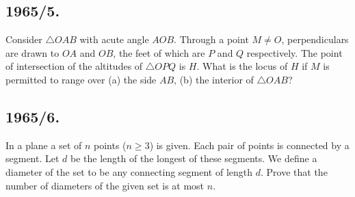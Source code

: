 \documentclass{article}
\begin{document}
\subsection*{1965/5.}
Consider $\triangle OAB$ with acute angle $AOB$. Through a point $M \neq O$, perpendiculars are drawn to $OA$ and $OB$, the feet of which are $P$ and $Q$ respectively. The point of intersection of the altitudes of $\triangle OPQ$ is $H$. What is the locus of $H$ if $M$ is permitted to range over (a) the side $AB$, (b) the interior of $\triangle OAB$?

\subsection*{1965/6.}
In a plane a set of $n$ points ($n \geq 3$) is given. Each pair of points is connected by a segment. Let $d$ be the length of the longest of these segments. We define a diameter of the set to be any connecting segment of length $d$. Prove that the number of diameters of the given set is at most $n$.
\end{document}
